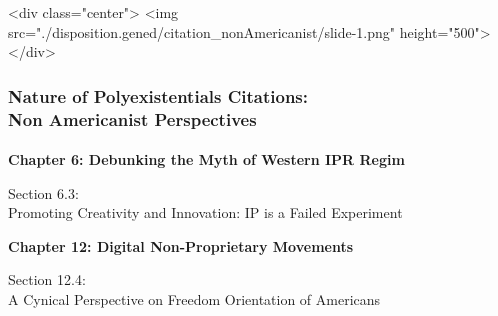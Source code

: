 \begin{whenOrg}
\begin{htmlonly}

\begin{frame}[fragile,plain,label=citation_nonAmericanist]
    \frametitle{}
    \framesubtitle{}
    \begin{rawhtml}
<div class="center">
<img src="./disposition.gened/citation_nonAmericanist/slide-1.png" height="500">
</div>
    \end{rawhtml}
\end{frame}
\end{htmlonly}

\begin{verblatex}

\begin{frame}[fragile,plain,label=citation_nonAmericanist]
    \frametitle{Nature of Polyexistentials Citations:\\ Non Americanist Perspectives}
    \framesubtitle{}


    \begin{center}
      \begin{large}
        \textbf{Chapter 6: Debunking the Myth of Western IPR Regim}
      \end{large}
  \end{center}

    \bigskip

  \begin{large}
Section 6.3:\\[10pt] Promoting Creativity and Innovation: IP is a Failed Experiment
  \end{large}

    \bigskip

   \begin{center}
      \begin{large}
        \textbf{Chapter 12: Digital Non-Proprietary Movements}
      \end{large}
  \end{center}

  \begin{large}
Section 12.4:\\[10pt] A Cynical Perspective on Freedom Orientation of Americans
  \end{large}


\end{frame}
\end{verblatex}
\end{whenOrg}
